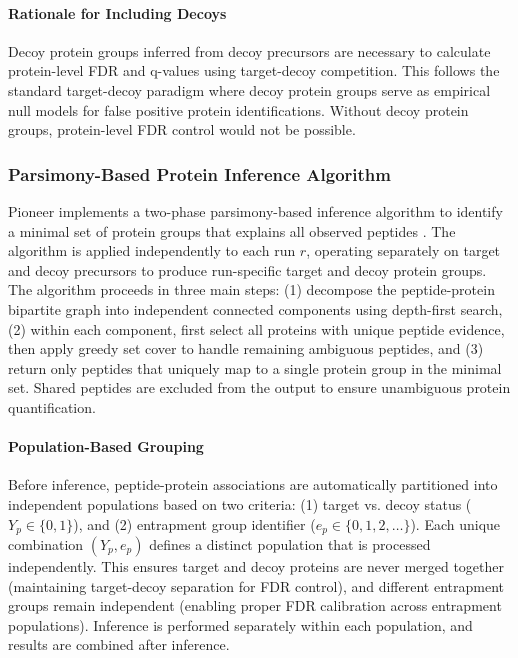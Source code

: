 \documentclass{article}
\begin{document}
\paragraph{Rationale for Including Decoys} Decoy protein groups inferred from decoy precursors are necessary to calculate protein-level FDR and q-values using target-decoy competition. This follows the standard target-decoy paradigm where decoy protein groups serve as empirical null models for false positive protein identifications. Without decoy protein groups, protein-level FDR control would not be possible.

\subsubsection{Parsimony-Based Protein Inference Algorithm}

Pioneer implements a two-phase parsimony-based inference algorithm to identify a minimal set of protein groups that explains all observed peptides \cite{Nesvizhskii2005,Zhang2007}. The algorithm is applied independently to each run $r$, operating separately on target and decoy precursors to produce run-specific target and decoy protein groups. The algorithm proceeds in three main steps: (1) decompose the peptide-protein bipartite graph into independent connected components using depth-first search, (2) within each component, first select all proteins with unique peptide evidence, then apply greedy set cover to handle remaining ambiguous peptides, and (3) return only peptides that uniquely map to a single protein group in the minimal set. Shared peptides are excluded from the output to ensure unambiguous protein quantification.

\paragraph{Population-Based Grouping} Before inference, peptide-protein associations are automatically partitioned into independent populations based on two criteria: (1) target vs. decoy status ($Y_p \in \{0,1\}$), and (2) entrapment group identifier ($e_p \in \{0, 1, 2, \ldots\}$). Each unique combination $(Y_p, e_p)$ defines a distinct population that is processed independently. This ensures target and decoy proteins are never merged together (maintaining target-decoy separation for FDR control), and different entrapment groups remain independent (enabling proper FDR calibration across entrapment populations). Inference is performed separately within each population, and results are combined after inference.
\end{document}
